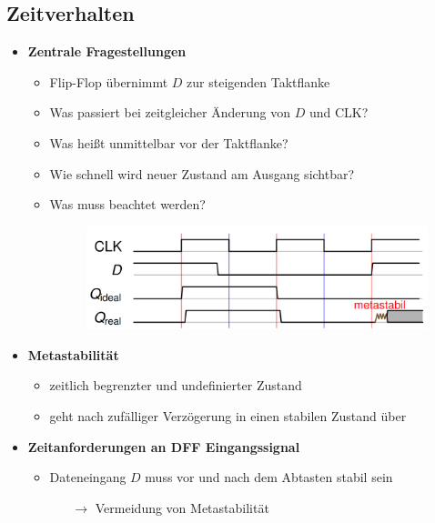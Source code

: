 \documentclass[11pt,a4paper]{article}
\begin{document}
\subsection{Zeitverhalten}
\begin{itemize}

\item \textbf{Zentrale Fragestellungen}
	\begin{itemize}
	
	\item Flip-Flop übernimmt $D$ zur steigenden Taktflanke
	\item Was passiert bei zeitgleicher Änderung von $D$ und CLK?
	\item Was heißt unmittelbar vor der Taktflanke?
	\item Wie schnell wird neuer Zustand am Ausgang sichtbar?
	\item Was muss beachtet werden?
	\item[] \begin{figure}[H]
				\begin{center}
				\includegraphics[height=3cm]{zeitseq1}
				\end{center}
			\end{figure}
	
	
	\end{itemize}
	
\pagebreak	
	
\item \textbf{Metastabilität}
	\begin{itemize}
	\item zeitlich begrenzter und undefinierter Zustand
	\item geht nach zufälliger Verzögerung in einen stabilen Zustand über
	\end{itemize}
	
\item \textbf{Zeitanforderungen an DFF Eingangssignal}
	\begin{itemize}
	\item Dateneingang $D$ muss vor und nach dem Abtasten stabil sein
		\begin{itemize}
		\item[$\rightarrow$] Vermeidung von Metastabilität
		\end{itemize}
	

\end{itemize}
\end{itemize}
\end{document}
